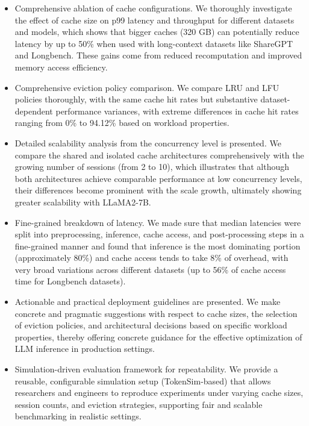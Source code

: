 \documentclass[sigconf,nonacm]{acmart}
\begin{document}
\begin{itemize}[leftmargin=*]
\item Comprehensive ablation of cache configurations. We thoroughly investigate the effect of cache size on p99 latency and throughput for different datasets and models, which shows that bigger caches (320 GB) can potentially reduce latency by up to 50\% when used with long-context datasets like ShareGPT and Longbench. These gains come from reduced recomputation and improved memory access efficiency. 
\item Comprehensive eviction policy comparison. We compare LRU and LFU policies thoroughly, with the same cache hit rates but substantive dataset-dependent performance variances, with extreme differences in cache hit rates ranging from 0\% to 94.12\% based on workload properties.
\item Detailed scalability analysis from the concurrency level is presented. We compare the shared and isolated cache architectures comprehensively with the growing number of sessions (from 2 to 10), which illustrates that although both architectures achieve comparable performance at low concurrency levels, their differences become prominent with the scale growth, ultimately showing greater scalability with LLaMA2-7B.
\item Fine-grained breakdown of latency. We made sure that median latencies were split into preprocessing, inference, cache access, and post-processing steps in a fine-grained manner and found that inference is the most dominating portion (approximately 80\%) and cache access tends to take 8\% of overhead, with very broad variations across different datasets (up to 56\% of cache access time for Longbench datasets).
\item Actionable and practical deployment guidelines are presented. We make concrete and pragmatic suggestions with respect to cache sizes, the selection of eviction policies, and architectural decisions based on specific workload properties, thereby offering concrete guidance for the effective optimization of LLM inference in production settings.
\item Simulation-driven evaluation framework for repeatability. We provide a reusable, configurable simulation setup (TokenSim-based) that allows researchers and engineers to reproduce experiments under varying cache sizes, session counts, and eviction strategies, supporting fair and scalable benchmarking in realistic settings.
\end{itemize}
 
\end{document}
